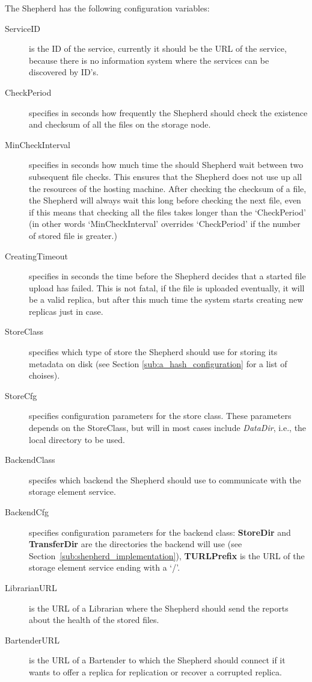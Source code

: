 \documentclass{book}
\begin{document}
The Shepherd has the following configuration variables:

\begin{description}
    \item[ServiceID] is the ID of the service, currently it should be the URL of the service, because there is no information system where the services can be discovered by ID's.
    \item[CheckPeriod] specifies in seconds how frequently the Shepherd should check the existence and checksum of all the files on the storage node.
    \item[MinCheckInterval] specifies in seconds how much time the should Shepherd wait between two subsequent file checks. This ensures that the Shepherd does not use up all the resources of the hosting machine. After checking the checksum of a file, the Shepherd will always wait this long before checking the next file, even if this means that checking all the files takes longer than the `CheckPeriod' (in other words `MinCheckInterval' overrides `CheckPeriod' if the number of stored file is greater.)
    \item[CreatingTimeout] specifies in seconds the time before the Shepherd decides that a started file upload has failed. This is not fatal, if the file is uploaded eventually, it will be a valid replica, but after this much time the system starts creating new replicas just in case.
    \item[StoreClass] specifies which type of store the Shepherd should use for storing its metadata on disk (see Section \ref{sub:a_hash_configuration} for a list of choises).
    \item[StoreCfg] specifies configuration parameters for the store class. These parameters depends on the StoreClass, but will in most cases include \emph{DataDir}, i.e., the local directory to be used.
    \item[BackendClass] specifes which backend the Shepherd should use to communicate with the storage element service.
    \item[BackendCfg] specifies configuration parameters for the backend class: \textbf{StoreDir} and \textbf{TransferDir} are the directories the backend will use (see Section~\ref{sub:shepherd_implementation}), \textbf{TURLPrefix} is the URL of the storage element service ending with a `/'.
    \item[LibrarianURL] is the URL of a Librarian where the Shepherd should send the reports about the health of the stored files.
    \item[BartenderURL] is the URL of a Bartender to which the Shepherd should connect if it wants to offer a replica for replication or recover a corrupted replica.
\end{description}
\end{document}
